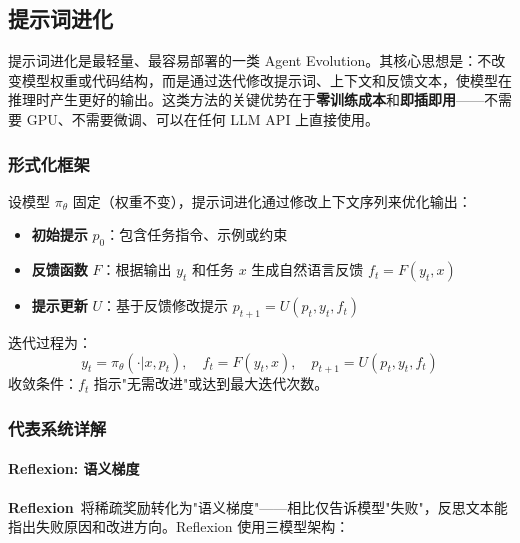 \subsection{提示词进化}\label{sec:prompt}

提示词进化是最轻量、最容易部署的一类 Agent Evolution。其核心思想是：不改变模型权重或代码结构，而是通过迭代修改提示词、上下文和反馈文本，使模型在推理时产生更好的输出。这类方法的关键优势在于\textbf{零训练成本}和\textbf{即插即用}——不需要 GPU、不需要微调、可以在任何 LLM API 上直接使用。

\subsubsection{形式化框架}

\begin{definition}[提示词进化框架]
设模型 $\pi_\theta$ 固定（权重不变），提示词进化通过修改上下文序列来优化输出：
\begin{itemize}
\item \textbf{初始提示} $p_0$：包含任务指令、示例或约束
\item \textbf{反馈函数} $F$：根据输出 $y_t$ 和任务 $x$ 生成自然语言反馈 $f_t = F(y_t, x)$
\item \textbf{提示更新} $U$：基于反馈修改提示 $p_{t+1} = U(p_t, y_t, f_t)$
\end{itemize}
迭代过程为：
\begin{equation}
y_t = \pi_\theta(\cdot | x, p_t), \quad f_t = F(y_t, x), \quad p_{t+1} = U(p_t, y_t, f_t)
\label{eq:prompt-evolve}
\end{equation}
收敛条件：$f_t$ 指示"无需改进"或达到最大迭代次数。
\end{definition}

\subsubsection{代表系统详解}

\paragraph{Reflexion: 语义梯度}

\textbf{Reflexion}~\citep{reflexion2023}将稀疏奖励转化为"语义梯度"——相比仅告诉模型"失败"，反思文本能指出失败原因和改进方向。Reflexion 使用三模型架构：

